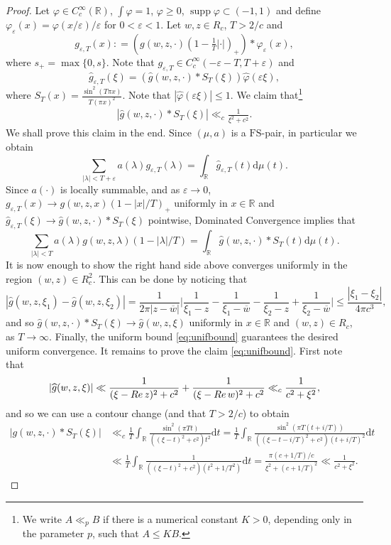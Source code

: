 \documentclass[a4paper,reqno,12pt]{amsart}
\DeclareMathOperator{\supp}{\mathrm{supp}}
\renewcommand{\r}{\mathbb{R}}
\newcommand{\ft}{\widehat}
\newcommand{\la}{\lambda}
\newcommand{\ep}{\varepsilon}
\newcommand{\p}{\varphi}
\renewcommand{\d}{\mathrm{d}}
\newcommand{\w}{\ov{w}}
\newcommand{\1}{{\bf 1}}
\newcommand{\fs}{\mathrm{FS}}
\newcommand{\ov}[1]{\overline{#1}}
\renewcommand{\1}{{\bo 1}}
\renewcommand{\Re}{{\rm Re}\,}
\renewcommand{\a}{a(\cdot)}
\begin{document}
\begin{proof}
Let $\p\in C_c^\infty(\r)$, $\int \p = 1$, $\p\geq 0$, $\supp \p \subset (-1,1)$ and define $\p_\ep(x)=\p(x/\ep)/\ep$ for $0<\ep<1$. Let $w,z\in R_c$, $T>2/c$ and
$$
g_{\ep,T}(x)  : = (g(w,z,\cdot)(1-\tfrac{1}T|\cdot|)_+) * \p_\ep(x),
$$
where $s_+=\max\{0,s\}$. Note that $g_{\ep,T}\in C_c^\infty(-\ep-T,T+\ep)$ and
$$
\ft g_{\ep,T}(\xi) = (\ft g(w,z,\cdot) * {S_T}(\xi)) \ft \p(\ep \xi),
$$
where $S_T(x)=\frac{\sin^2(T \pi x)}{T (\pi x)^2}$. Note that $|\ft \p(\ep \xi) |\leq 1$. We claim that\footnote{We write $A\ll_p B$ if there is a numerical constant $K>0$, depending only in the parameter $p$, such that $A\leq K B$.}
\begin{align}\label{eq:unifbound}
|\ft g(w,z,\cdot) * {S_T}(\xi) | \ll_c \frac{1}{\xi^2+c^2}.
\end{align}
We shall prove this claim in the end. Since $(\mu,a)$ is a $\fs$-pair, in particular we obtain
$$
\sum_{|\la|<{T+\ep}}a(\la)g_{\ep,T}(\la) = \int_\r \ft g_{\ep,T}(t)\d\mu(t).
$$
Since $\a$ is locally summable, and as $\ep\to0$, $g_{\ep,T}(x)\to g(w,z,x)(1-|x|/T)_+$ uniformly in $x\in \r$ and $\ft g_{\ep,T}(\xi) \to \ft g(w,z,\cdot) * S_T(\xi)$ pointwise, Dominated Convergence implies that
$$
\sum_{|\la|<T}a(\la)g(w,z,\la)(1-|\la|/T) =  \int_\r \ft g(w,z,\cdot) * {S_T}(t)\d\mu(t).
$$
It is now enough to show the right hand side above converges uniformly in the region $(w,z)\in R_c^2$.  This can be done by noticing that 
$$
|\ft g(w,z,\xi_1)-\ft g(w,z,\xi_2)| = \frac{1}{2\pi |z-\w|}\bigg|\frac{1}{\xi_1-z}-\frac{1}{\xi_1-\w}-\frac{1}{\xi_2-z}+\frac{1}{\xi_2-\w}\bigg| \leq \frac{|\xi_1-\xi_2|}{4\pi c^3},
$$
and so $\ft g(w,z,\cdot) * {S_T}(\xi) \to \ft g(w,z,\xi)$ uniformly in $x\in \r$ and $(w,z)\in R_c$, as $T\to\infty$. Finally, the uniform bound \eqref{eq:unifbound} guarantees the desired uniform convergence. It remains to prove the claim \eqref{eq:unifbound}. First note that 
$$
|\ft g(w,z,\xi)|  \ll \frac{1}{(\xi-\Re z)^2+c^2} + \frac{1}{(\xi-\Re w)^2+c^2} \ll_c \frac{1}{c^2+\xi^2},
$$
and so we can use a contour change  (and that $T>2/c$) to obtain 
\begin{align*}
|g(w,z,\cdot) * {S_T}(\xi)|  & \ll_c \frac1{T} \int_{\r} \frac{\sin^2(\pi T t)}{((\xi-t)^2+c^2)t^2}\d t  = \frac1{T} \int_{\r} \frac{\sin^2(\pi T (t+i/T))}{((\xi-t-i/T)^2+c^2)(t+i/T)^2}\d t \\
& \ll \frac1{T} \int_{\r} \frac{1}{((\xi-t)^2+c^2)(t^2+1/T^2)}\d t = \frac{\pi(c+1/T)/c}{\xi^2 + (c+1/T)^2} \ll \frac{1}{c^2+\xi^2}.
\end{align*}
\end{proof}
\end{document}
